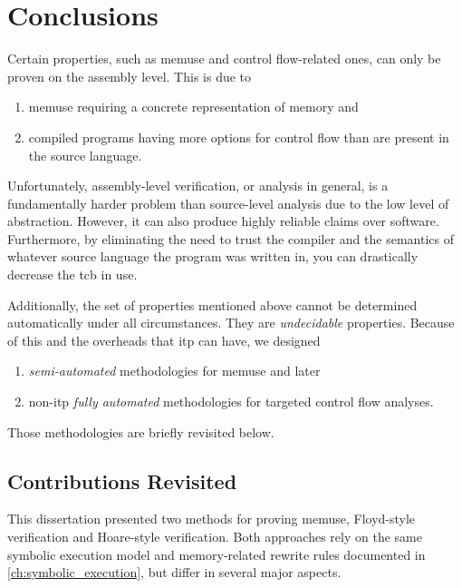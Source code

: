 \chapter{Conclusions}\label{ch:conclusions}
Certain properties, such as \gls{memuse} and control flow-related ones, can only be proven on the assembly level.
This is due to
\begin{enumerate}
  \item \gls{memuse} requiring a concrete representation of memory and
  \item compiled programs having more options for control flow than are present in the source language.
\end{enumerate}
Unfortunately, assembly-level verification, or analysis in general, is a fundamentally harder problem than source-level analysis due to the low level of abstraction.
However, it can also produce highly reliable claims over software.
Furthermore, by eliminating the need to trust the compiler and the semantics of whatever source language the program was written in, you can drastically decrease the \gls{tcb} in use.

Additionally, the set of properties mentioned above cannot be determined automatically under all circumstances. They are \emph{undecidable} properties.
Because of this and the overheads that \gls{itp} can have, we designed
\begin{enumerate}
  \item \emph{semi-automated} methodologies for \gls{memuse} and later
  \item non-\gls{itp} \emph{fully automated} methodologies for targeted control flow analyses.
\end{enumerate}
Those methodologies are briefly revisited below.

\section{Contributions Revisited}
This dissertation presented two methods for proving \gls{memuse},
Floyd-style verification and Hoare-style verification.
Both approaches rely on the same symbolic execution model and memory-related rewrite rules documented in \cref{ch:symbolic_execution}, but differ in several major aspects.
\begin{comment}
  \begin{remark}[Hoare triple usage]
    Technically they also both use Hoare triples, but only \cref{ch:syntax} uses proper Hoare rules.
    \Cref{ch:cfg} uses a modified style that takes a halting condition~$H$ instead of a syntactic construct in the middle.
  \end{remark}
\end{comment}

